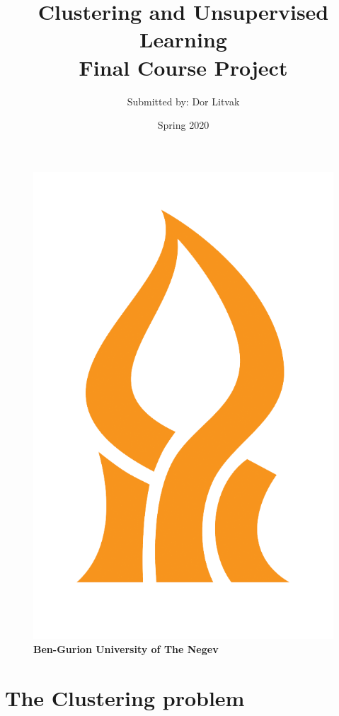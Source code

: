 \documentclass[12pt, a4paper]{paper}
\title{\textbf{Clustering and Unsupervised Learning \\ Final Course Project}}
\author{Submitted by: Dor Litvak}
\date{Spring 2020}
\begin{document}

\maketitle



\begin{figure}[h!]
\centering
\includegraphics[scale=0.1]{bgu.png} \\
\textbf{Ben-Gurion University of The Negev} 
\end{figure}

\newpage


\section*{The Clustering problem}
\end{document}
